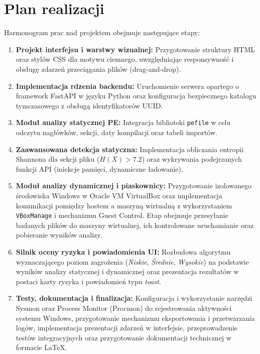 \documentclass{article}
\begin{document}
\section{Plan realizacji}
\label{sec:plan}
Harmonogram prac nad projektem obejmuje następujące etapy:
\begin{enumerate}
\item \textbf{Projekt interfejsu i warstwy wizualnej:} Przygotowanie struktury HTML oraz stylów CSS dla motywu ciemnego, uwzględniając responsywność i obsługę zdarzeń przeciągania plików (drag-and-drop).
\item \textbf{Implementacja rdzenia backendu:} Uruchomienie serwera opartego o framework FastAPI w języku Python oraz konfiguracja bezpiecznego katalogu tymczasowego z obsługą identyfikatorów UUID.
\item \textbf{Moduł analizy statycznej PE:} Integracja biblioteki \texttt{pefile} w celu odczytu nagłówków, sekcji, daty kompilacji oraz tabeli importów.
\item \textbf{Zaawansowana detekcja statyczna:} Implementacja obliczania entropii Shannona dla sekcji pliku ($H(X) > 7.2$) oraz wykrywania podejrzanych funkcji API (iniekcje pamięci, dynamiczne ładowanie).
\item \textbf{Moduł analizy dynamicznej i piaskownicy:} Przygotowanie izolowanego środowiska Windows w Oracle VM VirtualBox oraz implementacja komunikacji pomiędzy hostem a maszyną wirtualną z wykorzystaniem \texttt{VBoxManage} i mechanizmu Guest Control. Etap obejmuje przesyłanie badanych plików do maszyny wirtualnej, ich kontrolowane uruchamianie oraz pobieranie wyników analizy.
\item \textbf{Silnik oceny ryzyka i powiadomienia UI:} Rozbudowa algorytmu wyznaczającego poziom zagrożenia (\textit{Niskie}, \textit{Średnie}, \textit{Wysokie}) na podstawie wyników analizy statycznej i dynamicznej oraz prezentacja rezultatów w postaci karty ryzyka i powiadomień typu \textit{toast}.
\item \textbf{Testy, dokumentacja i finalizacja:} Konfiguracja i wykorzystanie narzędzi Sysmon oraz Process Monitor (Procmon) do rejestrowania aktywności systemu Windows, przygotowanie mechanizmu eksportowania i przetwarzania logów, implementacja prezentacji zdarzeń w interfejsie, przeprowadzenie testów integracyjnych oraz przygotowanie dokumentacji technicznej w formacie LaTeX.
\end{enumerate}
\end{document}
